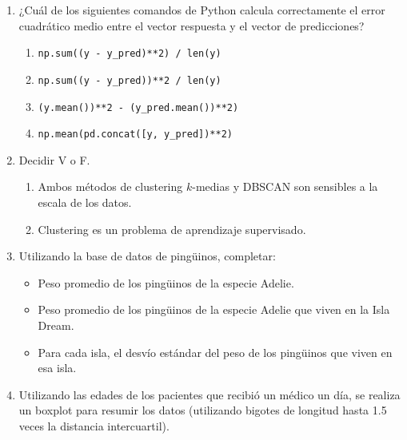 \documentclass[12pt]{article}
\begin{document}
\begin{enumerate}
\item ¿Cuál de los siguientes comandos de Python calcula correctamente el error cuadrático medio entre el vector respuesta y el vector de predicciones?
\begin{enumerate}
\item \lstinline{np.sum((y - y_pred)**2) / len(y)}
\item \lstinline{np.sum((y - y_pred))**2 / len(y)}
\item \lstinline{(y.mean())**2 - (y_pred.mean())**2)}
\item \lstinline{np.mean(pd.concat([y, y_pred])**2)}
\end{enumerate}

\item Decidir V o F.

\begin{enumerate}
\item Ambos métodos de clustering $k$-medias y DBSCAN son sensibles a la escala de los datos.
\item Clustering es un problema de aprendizaje supervisado.
\end{enumerate}

\item Utilizando la base de datos de ping\"uinos, completar:

\begin{itemize}
\item Peso promedio de los ping\"uinos de la especie Adelie.
\item Peso promedio de los ping\"uinos de la especie Adelie que viven en la Isla Dream.
\item Para cada isla, el desvío estándar del peso de los pingüinos que viven en esa isla.
\end{itemize}

\item Utilizando las edades de los pacientes que recibió un médico un día, se realiza un boxplot para resumir los datos (utilizando bigotes de longitud hasta 1.5 veces la distancia intercuartil).


\end{enumerate}
\end{document}
